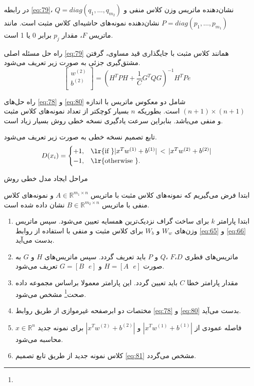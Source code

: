 در رابطه \ref{eq:79}،  $Q=diag(q_1,\dots,q_{m_{2}})$ نشان‌دهنده ماتریس وزن کلاس منفی و  $P=diag(p_1,\dots  ,p_{m_{1}})$ نشان‌دهنده نمونه‌های حاشیه‌ای کلاس مثبت است. مانند ماتریس $F$، مقدار $p_j$  برابر 0 یا 1 است.

راه حل مسئله اصلی \ref{eq:79} همانند کلاس مثبت با جایگذاری قید مساوی، گرفتن مشتق‌گیری جزئی به صورت زیر تعریف می‌شود.
\begin{equation}\label{eq:80}
\left[ \begin{matrix}
{{w}^{\left( 2 \right)}}  \\
{{b}^{\left( 2 \right)}}  \\
\end{matrix} \right] = {{({{H}^{T}}PH+\frac{1}{C}{{G}^{T}}QG)}^{-1}}{{H}^{T}}Pe
\end{equation}

راه حل‌های \ref{eq:78} و \ref{eq:80} شامل دو معکوس ماتریس با اندازه $(n+1)\times (n +1)$ است. بطوریکه $n$ بسیار کوچکتر از تعداد نمونه‌های کلاس مثبت و منفی می‌باشد. بنابراین سرعت یادگیری نسخه خطی روش  بسیار زیاد است.

تابع تصمیم نسخه خطی به صورت زیر تعریف می‌شود.
\begin{equation}\label{eq:81}
D(x_i) =
\begin{cases}
+1, & \textrm{\lr{if }} |{{x}^T}{{w}^{(1)}}+{{b}^{(1)}}|\, < \, |{{x}^T}{{w}^{(2)}}+{{b}^{(2)}}|  \\
-1, & \textrm{\lr{otherwise }}.
\end{cases}
\end{equation}
 
\begin{algo}
	مراحل ایجاد مدل خطی روش  
	
	ابتدا فرض می‌گیریم که نمونه‌های کلاس مثبت با ماتریس  $A\in {{\mathbb{R}}^{{{m}_{1}}\times n}}$ و نمونه‌های کلاس منفی با ماتریس  $B\in {{\mathbb{R}}^{{{m}_{2}}\times n}}$ نشان داده شده است.
	
	\begin{enumerate}
		\item ابتدا پارامتر  $k$ برای ساخت گراف نزدیک‌ترین همسایه تعیین می‌شود. سپس ماتریس وزن‌های  $W_{w}$ و   $W_{b}$ برای کلاس مثبت و منفی با استفاده از روابط \ref{eq:65} و \ref{eq:66} بدست می‌آید.
		\item ماتریس‌های قطری  $D$،$F$ ،$Q$  و $P$ باید تعریف گردد. سپس ماتریس‌های $H$ و  $G$ به صورت  $H=[A\text{ } e]$ و $G=[B\text{ }e]$  تعریف می‌شود.
		\item مقدار پارامتر خطا $C$ باید تعیین گردد. این پارامتر معمولا براساس مجموعه داده صحت\footnote{}  مشخص می‌شود.
		\item مختصات دو ابرصفحه غیرموازی از طریق روابط \ref{eq:78} و \ref{eq:80} بدست می‌آید.
		\item فاصله عمودی از $|{{x}^T}{{w}^{(1)}}+{{b}^{(1)}}|$  و  $|{{x}^T}{{w}^{(2)}}+{{b}^{(2)}}|$ برای نمونه جدید   $x \in \mathbb{R}^{n}$ محاسبه می‌شود.
		\item کلاس نمونه جدید از طریق تابع تصمیم \ref{eq:81} مشخص می‌گردد.
	\end{enumerate}
\end{algo}

